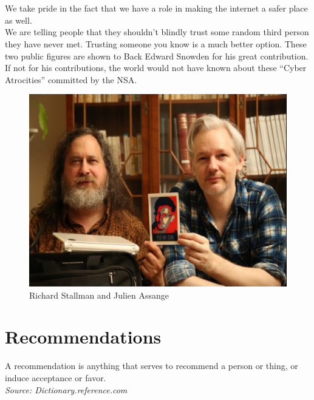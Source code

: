 \documentclass[11pt]{book}
\begin{document}
\\\\We take pride in the fact that we have a role in making the internet a safer place as well.
\\ We are telling people that they shouldn't blindly trust some random third person they have never met. Trusting someone you know is a much better option. 
\newpage
These two public figures are shown to Back Edward Snowden for his great contribution. 
\\If not for his contributions, the world would not have known about these ``Cyber Atrocities'' committed by the NSA. 
\begin{figure}[ht!]
	\centering
	\includegraphics[width=150mm]{prism5.png}
	\caption{Richard Stallman and Julien Assange}
	\label{overflow}
\end{figure}
\newpage

\newpage
\chapter{Recommendations}
A recommendation is anything that serves to recommend a person or thing, or induce acceptance or favor. 
\\\emph{Source: Dictionary.reference.com}
\end{document}
